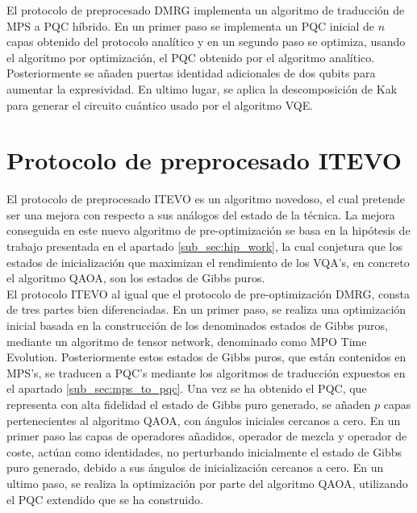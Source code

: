 El protocolo de preprocesado DMRG implementa un algoritmo de traducción de MPS a \mbox{PQC} híbrido. En un primer paso se implementa un \mbox{PQC} inicial de $n$ capas obtenido del protocolo analítico y en un segundo paso se optimiza, usando el algoritmo por optimización, el \mbox{PQC} obtenido por el algoritmo analítico. Posteriormente se añaden puertas identidad adicionales de dos qubits para aumentar la expresividad. En ultimo lugar, se aplica la descomposición de Kak para generar el circuito cuántico usado por el algoritmo VQE. \\


\newpage

\section{Protocolo de preprocesado ITEVO}
\label{sub_sec:i_tevo}

El protocolo de preprocesado ITEVO es un algoritmo novedoso, el cual pretende ser una mejora con respecto a sus análogos del estado de la técnica. La mejora conseguida en este nuevo algoritmo de pre-optimización se basa en la hipótesis de trabajo presentada en el apartado \ref{sub_sec:hip_work}, la cual conjetura que los estados de inicialización que maximizan el rendimiento de los VQA's, en concreto el algoritmo QAOA, son los estados de Gibbs puros. \\

El protocolo ITEVO al igual que el protocolo de pre-optimización DMRG, consta de tres partes bien diferenciadas. En un primer paso, se realiza una optimización inicial basada en la construcción de los denominados estados de Gibbs puros, mediante un algoritmo de tensor network, denominado como MPO Time Evolution. Posteriormente estos estados de Gibbs puros, que están contenidos en MPS's, se traducen a \mbox{PQC's} mediante los algoritmos de traducción expuestos en el apartado \ref{sub_sec:mps_to_pqc}. Una vez se ha obtenido el \mbox{PQC}, que representa con alta fidelidad el estado de Gibbs puro generado, se añaden $p$ capas pertenecientes al algoritmo QAOA, con ángulos iniciales cercanos a cero. En un primer paso las capas de operadores añadidos, operador de mezcla y operador de coste, actúan como identidades, no perturbando inicialmente el estado de Gibbs puro generado, debido a sus ángulos de inicialización cercanos a cero. En un ultimo paso, se realiza la optimización por parte del algoritmo QAOA, utilizando el \mbox{PQC} extendido que se ha construido. \\

